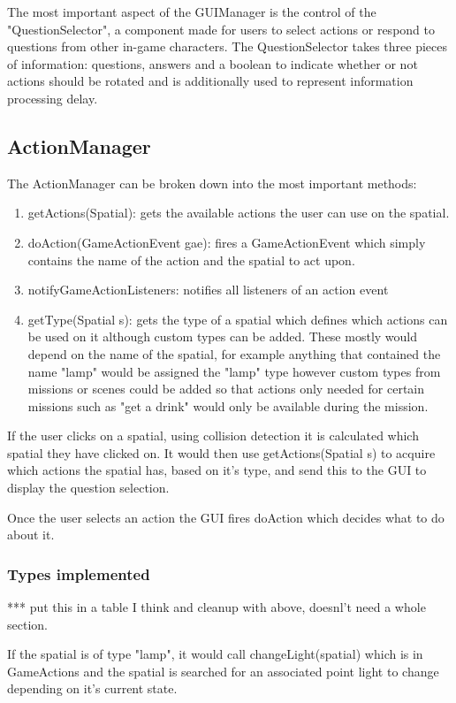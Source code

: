 \documentclass[11pt]{report}
\begin{document}
The most important aspect of the GUIManager is the control of the "QuestionSelector", a component made for users to select actions or respond to questions from other in-game characters. The QuestionSelector takes three pieces of information: questions, answers and a boolean to indicate whether or not actions should be rotated and is additionally used to represent information processing delay.


\subsection{ActionManager}
The ActionManager can be broken down into the most important methods:

\begin{enumerate}
\item getActions(Spatial): gets the available actions the user can use on the spatial.
\item doAction(GameActionEvent gae): fires a GameActionEvent which simply contains the name of the action and the spatial to act upon.
\item notifyGameActionListeners: notifies all listeners of an action event
\item getType(Spatial s): gets the type of a spatial which defines which actions can be used on it although custom types can be added. These mostly would depend on the name of the spatial, for example anything that contained the name "lamp" would be assigned the "lamp" type however custom types from missions or scenes could be added so that actions only needed for certain missions such as "get a drink" would only be available during the mission.
\end{enumerate}

If the user clicks on a spatial, using collision detection it is calculated which spatial they have clicked on. It would then use getActions(Spatial s) to acquire which actions the spatial has, based on it's type, and send this to the GUI to display the question selection.

Once the user selects an action the GUI fires doAction which decides what to do about it.

\subsubsection*{Types implemented}
*** put this in a table I think and  cleanup with above, doesnl't need a whole section.

If the spatial is of type "lamp", it would call changeLight(spatial) which is in GameActions and the spatial is searched for an associated point light to change depending on it's current state. 
\end{document}
